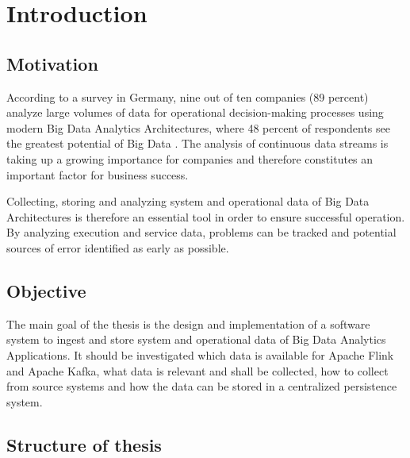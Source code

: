 \chapter{Introduction}
\section{Motivation}
According to a survey in Germany, nine out of ten companies (89 percent) analyze large volumes of data for operational decision-making
processes using modern Big Data Analytics Architectures, where 48 percent of respondents see the greatest potential of Big Data
\cite{BITK14}. The analysis of continuous data streams is taking up a growing importance for companies and therefore constitutes an
important factor for business success.

Collecting, storing and analyzing system and operational data of Big Data Architectures is therefore an essential tool in order
to ensure successful operation. By analyzing execution and service data, problems can be tracked and potential sources of error
identified as early as possible.

\section{Objective}

The main goal of the thesis is the design and implementation of a software system to ingest and  store system and operational
data of Big Data Analytics Applications. It should be investigated which data is available for Apache Flink and Apache Kafka, what
data is relevant and shall be collected, how to collect from source systems and how the data can be stored in a centralized persistence
system.

\section{Structure of thesis}
